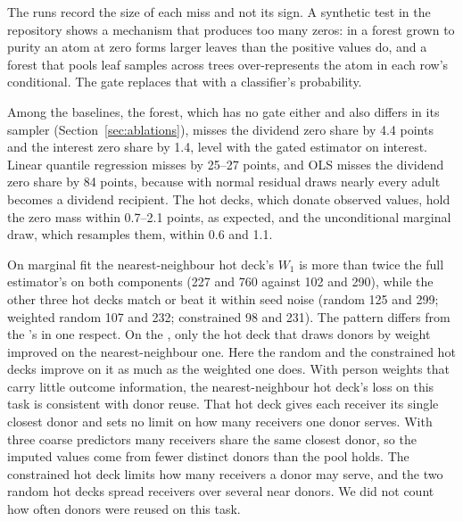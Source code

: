 The runs record the size of each miss and not its sign. A
synthetic test in the repository shows a mechanism that produces too many
zeros: in a forest grown to
purity an atom at zero forms larger leaves than the positive values do, and
a forest that pools leaf samples across trees over-represents the atom in
each row's conditional. The gate replaces that with a classifier's
probability.

Among the baselines, the \microimpute{} forest, which has no gate either and
also differs in its sampler (Section~\ref{sec:ablations}), misses the dividend
zero share by 4.4 points and the interest zero share by 1.4, level with the
gated estimator on interest. Linear quantile regression misses by 25--27
points, and OLS
misses the dividend zero share by 84 points, because with normal residual
draws nearly every adult becomes a dividend recipient. The hot decks, which
donate
observed values, hold the zero mass within 0.7--2.1 points, as expected,
and the unconditional marginal draw, which resamples them, within 0.6 and
1.1.

On
marginal fit the nearest-neighbour hot deck's $W_1$ is more than twice the
full estimator's on both components (227 and 760 against 102 and 290),
while the other three hot decks match or beat it within seed noise (random
125 and 299; weighted random 107 and 232; constrained 98 and 231). The
pattern differs from the \scf{}'s in one respect. On the \scf{}, only the
hot deck that draws donors by weight improved on the nearest-neighbour one.
Here the random and the constrained hot decks improve on it as much as the
weighted one does.
With person weights that carry little outcome information, the
nearest-neighbour hot deck's loss on this task is consistent with donor
reuse. That hot deck gives each receiver its single closest donor and sets
no limit on how many receivers one donor serves. With three coarse
predictors many receivers share the same closest donor, so the imputed
values come from fewer distinct donors than the pool holds. The constrained
hot deck limits how many receivers a donor may serve, and the two random hot
decks spread receivers over several near donors. We did not count how often
donors were reused on this task.

